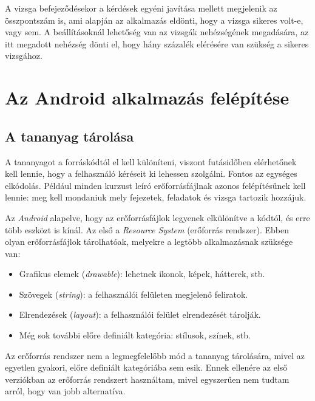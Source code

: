 \documentclass[12pt,a4paper]{article}
\begin{document}
	A vizsga befejeződésekor a kérdések egyéni javítása mellett megjelenik az összpontszám is, ami alapján az alkalmazás eldönti, hogy a vizsga sikeres volt-e, vagy sem. A beállításoknál lehetőség van az vizsgák nehézségének megadására, az itt megadott nehézség dönti el, hogy hány százalék elérésére van szükség a sikeres vizsgához.
	
	\section{Az Android alkalmazás felépítése}\label{android_alk_felepites}
	
	
	\subsection{A tananyag tárolása}\label{tananyag_tarolasa}
	
	A tananyagot a forráskódtól el kell különíteni, viszont futásidőben elérhetőnek kell lennie, hogy a felhasználó kéréseit ki lehessen szolgálni. Fontos az egységes elkódolás. Például minden kurzust leíró erőforrásfájlnak azonos felépítésűnek kell lennie: meg kell mondaniuk mely fejezetek, feladatok és vizsga tartozik hozzájuk.
	
	Az \textit{Android} alapelve, hogy az erőforrásfájlok legyenek elkülönítve a kódtól, és erre több eszközt is kínál. Az első a \textit{Resource System} (erőforrás rendszer). Ebben olyan erőforrásfájlok tárolhatóak, melyekre a legtöbb alkalmazásnak szüksége van:
	
	\begin{itemize}
		\item Grafikus elemek (\textit{drawable}): lehetnek ikonok, képek, hátterek, stb.
		\item Szövegek (\textit{string}): a felhasználói felületen megjelenő feliratok.
		\item Elrendezések (\textit{layout}): a felhasználói felület elrendezését tárolják.
		\item Még sok további előre definiált kategória: stílusok, színek, stb.
	\end{itemize} 

	Az erőforrás rendszer nem a legmegfelelőbb mód a tananyag tárolására, mivel az egyetlen gyakori, előre definiált kategóriába sem esik. Ennek ellenére az első verziókban az erőforrás rendszert használtam, mivel egyszerűen nem tudtam arról, hogy van jobb alternatíva.
	
\end{document}
